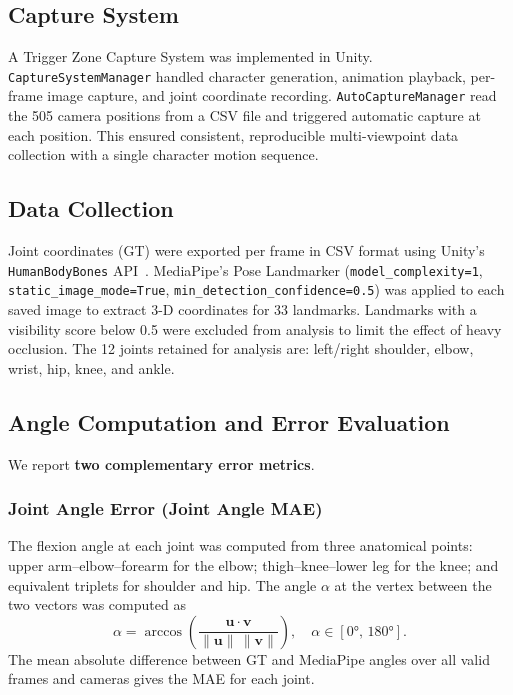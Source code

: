 \documentclass[twocolumn]{article}
\begin{document}
\subsection{Capture System}

A Trigger Zone Capture System was implemented in Unity.
\texttt{CaptureSystemManager} handled character generation, animation
playback, per-frame image capture, and joint coordinate recording.
\texttt{AutoCaptureManager} read the 505 camera positions from a CSV file
and triggered automatic capture at each position. This ensured consistent,
reproducible multi-viewpoint data collection with a single character motion
sequence.

\subsection{Data Collection}

Joint coordinates (GT) were exported per frame in CSV format using Unity's
\texttt{HumanBodyBones} API~\cite{unity}. MediaPipe's Pose Landmarker
(\texttt{model\_complexity=1}, \texttt{static\_image\_mode=True},
\texttt{min\_detection\_confidence=0.5}) was applied to each saved image to
extract 3-D coordinates for 33 landmarks. Landmarks with a visibility score
below 0.5 were excluded from analysis to limit the effect of heavy
occlusion. The 12 joints retained for analysis are: left/right shoulder,
elbow, wrist, hip, knee, and ankle.

\subsection{Angle Computation and Error Evaluation}

We report \textbf{two complementary error metrics}.

\subsubsection{Joint Angle Error (Joint Angle MAE)}

The flexion angle at each joint was computed from three anatomical points:
upper arm–elbow–forearm for the elbow; thigh–knee–lower leg for the knee;
and equivalent triplets for shoulder and hip. The angle $\alpha$ at the
vertex between the two vectors was computed as
\[
  \alpha = \arccos\!\left(\frac{\mathbf{u}\cdot\mathbf{v}}
                               {\|\mathbf{u}\|\,\|\mathbf{v}\|}\right),
  \quad \alpha \in [0°,\,180°].
\]
The mean absolute difference between GT and MediaPipe angles over all valid
frames and cameras gives the MAE for each joint.
\end{document}
